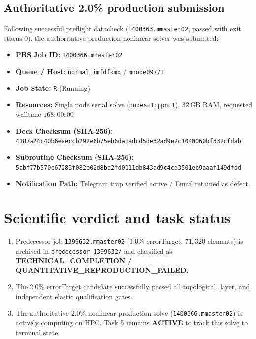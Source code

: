 \subsection{Authoritative 2.0\% production submission}
Following successful preflight datacheck (\texttt{1400363.mmaster02}, passed with exit status 0), the authoritative production nonlinear solver was submitted:
\begin{itemize}
  \item \textbf{PBS Job ID:} \texttt{1400366.mmaster02}
  \item \textbf{Queue / Host:} \texttt{normal\_imfdfkmq} / \texttt{mnode097/1}
  \item \textbf{Job State:} \texttt{R} (Running)
  \item \textbf{Resources:} Single node serial solve (\texttt{nodes=1:ppn=1}), $32\,\mathrm{GB}$ RAM, requested walltime $168:00:00$
  \item \textbf{Deck Checksum (SHA-256):} \texttt{4187a24c40b6eaeccb292e6b75eb6da1adcd5de32ad9e2c1040060bf332cfdab}
  \item \textbf{Subroutine Checksum (SHA-256):} \texttt{5abf77b570c67283f082e02d8ba2fd0111db843ad9c4cd3501eb9aaaf149dfdd}
  \item \textbf{Notification Path:} Telegram trap verified active / Email retained as defect.
\end{itemize}

\section{Scientific verdict and task status}
\begin{enumerate}
  \item Predecessor job \texttt{1399632.mmaster02} ($1.0\%$ errorTarget, $71{,}320$ elements) is archived in \texttt{predecessor\_1399632/} and classified as \textbf{TECHNICAL\_COMPLETION / QUANTITATIVE\_REPRODUCTION\_FAILED}.
  \item The $2.0\%$ errorTarget candidate successfully passed all topological, layer, and independent elastic qualification gates.
  \item The authoritative $2.0\%$ nonlinear production solve (\texttt{1400366.mmaster02}) is actively computing on HPC. Task 5 remains \textbf{ACTIVE} to track this solve to terminal state.
\end{enumerate}
